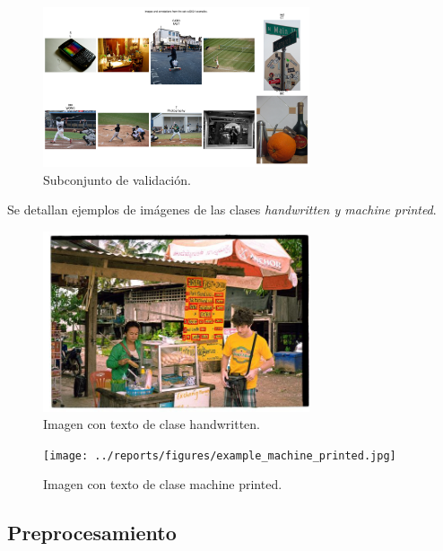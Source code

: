 \documentclass[12pt]{article}
\begin{document}
\begin{figure}[ht]
    \centering
    \includegraphics[width=0.7\textwidth]{../reports/figures/visualization_val2014.png} 
    \caption{Subconjunto de validación.}
    \label{fig:validacion}
\end{figure}


\newpage

Se detallan ejemplos de imágenes de las clases \textit{handwritten y machine printed}.

\begin{figure}[ht]
    \centering
    \includegraphics[width=0.7\textwidth]{../reports/figures/example_handwritten.jpg} 
    \caption{Imagen con texto de clase handwritten.}
    \label{fig:handwritten}
\end{figure}

\begin{figure}[ht]
    \centering
    \texttt{[image: ../reports/figures/example\_machine\_printed.jpg]} 
    \caption{Imagen con texto de clase machine printed.}
    \label{fig:machineprinted}
\end{figure}

\newpage


\subsection{Preprocesamiento}
\end{document}
